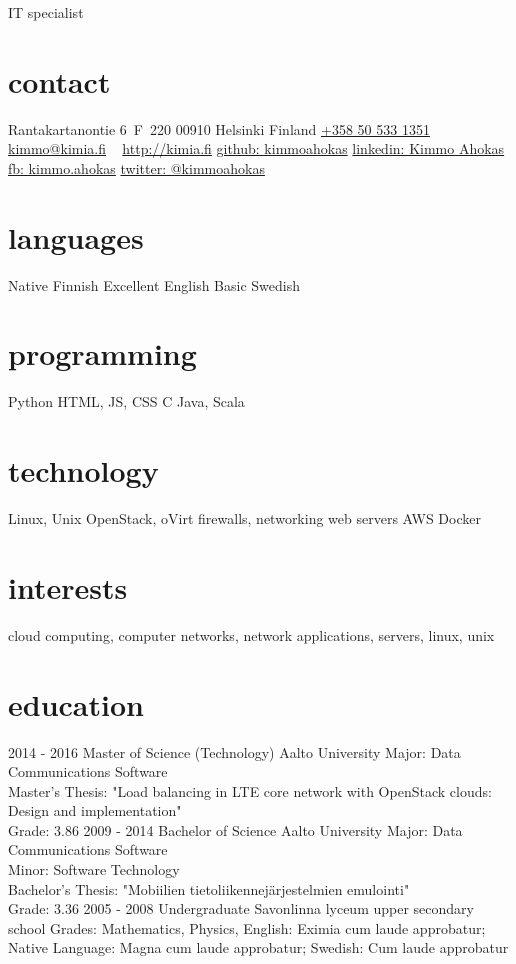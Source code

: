 \documentclass[]{friggeri-cv}
\begin{document}
       {IT specialist}

\begin{aside}
  \section{contact}
    Rantakartanontie 6~F~220
    00910 Helsinki
    Finland
    \href{tel:+358505331351}{+358 50 533 1351}
    \href{mailto:kimmo@kimia.fi}{kimmo@kimia.fi}
    ~
    \href{http://kimia.fi}{http://kimia.fi}
    \href{https://github.com/kimmoahokas}{github: kimmoahokas}
    \href{https://www.linkedin.com/in/kimmoahokas}{linkedin: Kimmo Ahokas}
    \href{https://www.facebook.com/kimmo.ahokas}{fb: kimmo.ahokas}
    \href{https://twitter.com/kimmoahokas}{twitter: @kimmoahokas}
  \section{languages}
    Native Finnish
    Excellent English
    Basic Swedish
  \section{programming}
    Python
    HTML, JS, CSS
    C
    Java, Scala
  \section{technology}
    Linux, Unix
    OpenStack, oVirt
    firewalls, networking
    web servers
    AWS
    Docker
\end{aside}

\section{interests}

cloud computing, computer networks, network applications, servers, linux, unix

\section{education}

\begin{entrylist}
  \entry
    {2014 - 2016}
    {Master of Science (Technology)}
    {Aalto University}
    {Major: Data Communications Software\\
    Master's Thesis: "Load balancing in LTE core network with OpenStack clouds:
    Design and implementation"\\
    Grade: 3.86}
  \entry
    {2009 - 2014}
    {Bachelor of Science}
    {Aalto University}
    {Major: Data Communications Software\\
    Minor: Software Technology\\
    Bachelor's Thesis: "Mobiilien tietoliikennejärjestelmien emulointi"\\
    Grade: 3.36}
  \entry
    {2005 - 2008}
    {Undergraduate}
    {Savonlinna lyceum upper secondary school}
    {Grades: Mathematics, Physics, English: Eximia cum laude approbatur; Native Language: Magna cum laude approbatur; Swedish: Cum laude approbatur}
\end{entrylist}
\end{document}
